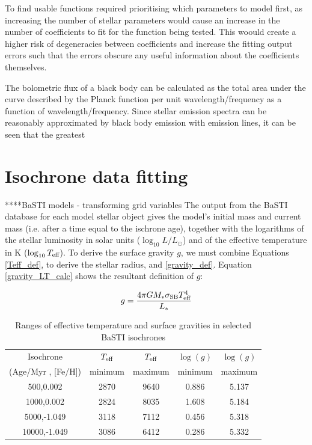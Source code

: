 \documentclass[12pt, a4paper]{report}
\begin{document}
To find usable functions required prioritising which parameters to model first, as increasing the number of stellar parameters would cause an increase in the number of coefficients to fit for the function being tested. This woould create a higher risk of degeneracies between coefficients and increase the fitting output errors such that the errors obscure any useful information about the coefficients themselves.

The bolometric flux of a black body can be calculated as the total area under the curve described by the Planck function per unit wavelength/frequency as a function of wavelength/frequency. Since stellar emission spectra can be reasonably approximated by black body emission with emission lines, it can be seen that the greatest 

\section{Isochrone data fitting}
****BaSTI models - transforming grid variables
The output from the BaSTI database for each model stellar object gives the model's initial mass and current mass (i.e. after a time equal to the ischrone age), together with the logarithms of the stellar luminosity in solar units ($\log_{10}{L/L_{\odot}}$) and of the effective temperature in K ($\log_{10}{T_{\textnormal{eff}}}$). To derive the surface gravity $g$, we must combine Equations \ref{Teff_def}, to derive the stellar radius, and \ref{gravity_def}. Equation \ref{gravity_LT_calc} shows the resultant definition of $g$:

\begin{equation}
\label{gravity_LT_calc}
g = \frac{4 \pi G M_{*} \sigma_{\textnormal{SB}} T_{\textnormal{eff}}^{4}}{L_{*}}
\end{equation}

\begin{table}
\begin{center}
\begin{tabular}{ccccc}
\hline
Isochrone & $T_{\textnormal{eff}}$ & $T_{\textnormal{eff}}$ & $\log(g)$ & $\log(g)$ \\
(Age/Myr , [Fe/H]) & minimum & maximum & minimum & maximum \\
\hline
500,0.002 & 2870 & 9640 & 0.886 & 5.137 \\
1000,0.002 & 2824 & 8035 & 1.608 & 5.184 \\
5000,-1.049 & 3118 & 7112 & 0.456 & 5.318 \\
10000,-1.049 & 3086 & 6412 & 0.286 & 5.332 \\
\hline
\end{tabular}
\caption{Ranges of effective temperature and surface gravities in selected BaSTI isochrones}
\label{variable_ranges}
\end{center}
\end{table}
\end{document}
